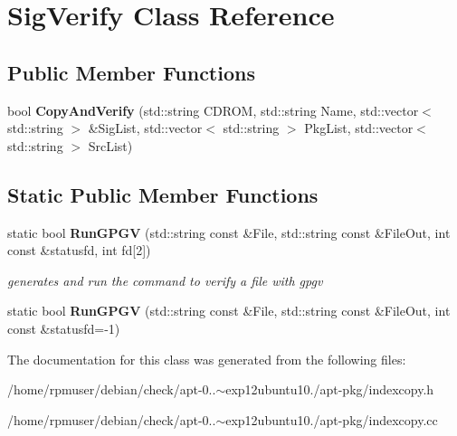 \section{\-Sig\-Verify \-Class \-Reference}
\label{classSigVerify}
\subsection*{\-Public \-Member \-Functions}
\begin{DoxyCompactItemize}
\item 
bool {\bfseries \-Copy\-And\-Verify} (std\-::string \-C\-D\-R\-O\-M, std\-::string \-Name, std\-::vector$<$ std\-::string $>$ \&\-Sig\-List, std\-::vector$<$ std\-::string $>$ \-Pkg\-List, std\-::vector$<$ std\-::string $>$ \-Src\-List)\label{classSigVerify_a490c2d5199afc84532e9d4a41f2de667}

\end{DoxyCompactItemize}
\subsection*{\-Static \-Public \-Member \-Functions}
\begin{DoxyCompactItemize}
\item 
static bool {\bf \-Run\-G\-P\-G\-V} (std\-::string const \&\-File, std\-::string const \&\-File\-Out, int const \&statusfd, int fd[2])\label{classSigVerify_acc0acd48c59a36ea78d6bb047e37b2c5}

\begin{DoxyCompactList}\small\item\em generates and run the command to verify a file with gpgv \end{DoxyCompactList}\item 
static bool {\bfseries \-Run\-G\-P\-G\-V} (std\-::string const \&\-File, std\-::string const \&\-File\-Out, int const \&statusfd=-\/1)\label{classSigVerify_a05ee63ec6903fbe86e1e4d3ee28aabd6}

\end{DoxyCompactItemize}


\-The documentation for this class was generated from the following files\-:\begin{DoxyCompactItemize}
\item 
/home/rpmuser/debian/check/apt-\/0..$\sim$exp12ubuntu10./apt-\/pkg/indexcopy.\-h\item 
/home/rpmuser/debian/check/apt-\/0..$\sim$exp12ubuntu10./apt-\/pkg/indexcopy.\-cc\end{DoxyCompactItemize}
